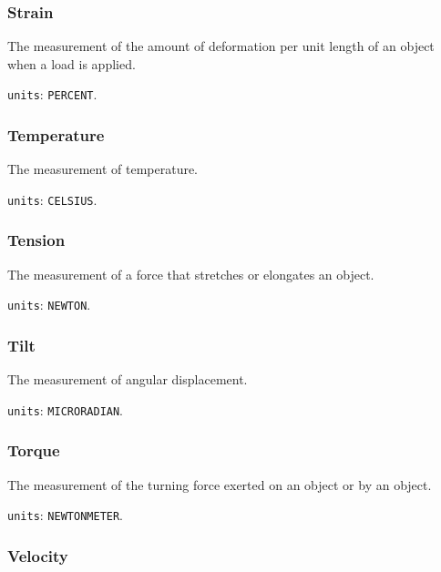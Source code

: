 \subsubsection{Strain}
\label{sec:Strain}



The measurement of the amount of deformation per unit length of an object when a load is applied.


\texttt{units}: \texttt{PERCENT}.


\subsubsection{Temperature}
\label{sec:Temperature}



The measurement of temperature.


\texttt{units}: \texttt{CELSIUS}.


\subsubsection{Tension}
\label{sec:Tension}



The measurement of a force that stretches or elongates an object.


\texttt{units}: \texttt{NEWTON}.


\subsubsection{Tilt}
\label{sec:Tilt}



The measurement of angular displacement.


\texttt{units}: \texttt{MICRO\textunderscore RADIAN}.


\subsubsection{Torque}
\label{sec:Torque}



The measurement of the turning force exerted on an object or by an object.


\texttt{units}: \texttt{NEWTON\textunderscore METER}.


\subsubsection{Velocity}
\label{sec:Velocity}




